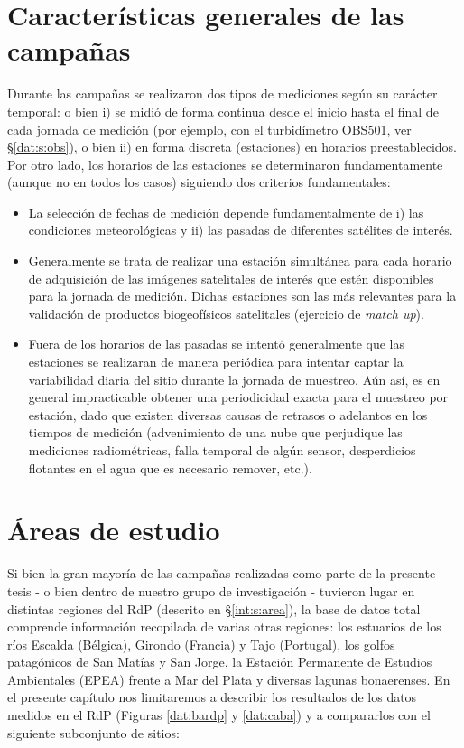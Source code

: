 \section{Características generales de las campañas}
\label{dat:s:generales}

    Durante las campañas se realizaron dos tipos de mediciones según su carácter temporal: o bien i) se midió de forma continua desde el inicio hasta el final de cada jornada de medición (por ejemplo, con el turbidímetro OBS501, ver \S \ref{dat:s:obs}), o bien ii) en forma discreta (estaciones) en horarios preestablecidos. Por otro lado, los horarios de las estaciones se determinaron fundamentamente (aunque no en todos los casos) siguiendo dos criterios fundamentales:
    
          \begin{itemize}
            \item La selección de fechas de medición depende fundamentalmente de i) las condiciones meteorológicas y ii) las pasadas de diferentes satélites de interés.
            \item  Generalmente se trata de realizar una estación simultánea para cada horario de adquisición de las imágenes satelitales de interés que estén disponibles para la jornada de medición. Dichas estaciones son las más relevantes para la validación de productos biogeofísicos satelitales (ejercicio de \textit{match up}).
            \item Fuera de los horarios de las pasadas se intentó generalmente que las estaciones se realizaran de manera periódica para intentar captar la variabilidad diaria del sitio durante la jornada de muestreo. Aún así, es en general impracticable obtener una periodicidad exacta para el muestreo por estación, dado que existen diversas causas de retrasos o adelantos en los tiempos de medición (advenimiento de una nube que perjudique las mediciones radiométricas, falla temporal de algún sensor, desperdicios flotantes en el agua que es necesario remover, etc.).
        \end{itemize}

\section{Áreas de estudio}
\label{dat:s:areas}

    Si bien la gran mayoría de las campañas realizadas como parte de la presente tesis - o bien dentro de nuestro grupo de investigación - tuvieron lugar en distintas regiones del RdP (descrito en \S \ref{int:s:area}), la base de datos total comprende información recopilada de varias otras regiones: los estuarios de los ríos Escalda (Bélgica), Girondo (Francia) y Tajo (Portugal), los golfos patagónicos de San Matías y San Jorge, la Estación Permanente de Estudios Ambientales (EPEA) frente a Mar del Plata y diversas lagunas bonaerenses. En el presente capítulo nos limitaremos a describir los resultados de los datos medidos en el RdP (Figuras \ref{dat:bardp} y \ref{dat:caba}) y a compararlos con el siguiente subconjunto de sitios:
    
